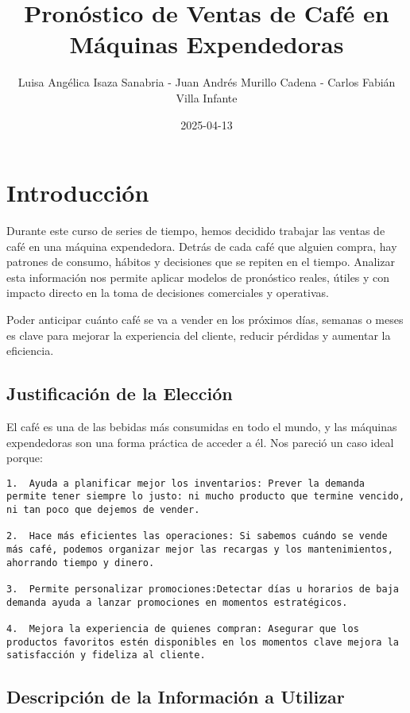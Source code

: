 \documentclass[
]{book}
\title{Pronóstico de Ventas de Café en Máquinas Expendedoras}
\author{Luisa Angélica Isaza Sanabria - Juan Andrés Murillo Cadena - Carlos Fabián Villa Infante}
\date{2025-04-13}
\begin{document}
\maketitle

{
\setcounter{tocdepth}{1}
\tableofcontents
}
\chapter{Introducción}\label{introducciuxf3n}

Durante este curso de series de tiempo, hemos decidido trabajar las ventas de café en una máquina expendedora. Detrás de cada café que alguien compra, hay patrones de consumo, hábitos y decisiones que se repiten en el tiempo. Analizar esta información nos permite aplicar modelos de pronóstico reales, útiles y con impacto directo en la toma de decisiones comerciales y operativas.

Poder anticipar cuánto café se va a vender en los próximos días, semanas o meses es clave para mejorar la experiencia del cliente, reducir pérdidas y aumentar la eficiencia.

\section{Justificación de la Elección}\label{justificaciuxf3n-de-la-elecciuxf3n}

El café es una de las bebidas más consumidas en todo el mundo, y las máquinas expendedoras son una forma práctica de acceder a él. Nos pareció un caso ideal porque:

\begin{verbatim}
1.  Ayuda a planificar mejor los inventarios: Prever la demanda permite tener siempre lo justo: ni mucho producto que termine vencido, ni tan poco que dejemos de vender.

2.  Hace más eficientes las operaciones: Si sabemos cuándo se vende más café, podemos organizar mejor las recargas y los mantenimientos, ahorrando tiempo y dinero.

3.  Permite personalizar promociones:Detectar días u horarios de baja demanda ayuda a lanzar promociones en momentos estratégicos.

4.  Mejora la experiencia de quienes compran: Asegurar que los productos favoritos estén disponibles en los momentos clave mejora la satisfacción y fideliza al cliente.
\end{verbatim}

\section{Descripción de la Información a Utilizar}\label{descripciuxf3n-de-la-informaciuxf3n-a-utilizar}
\end{document}
